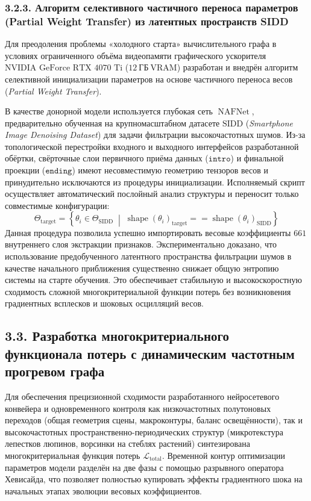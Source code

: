 \documentclass[12pt,a4paper]{article}
\begin{document}
\subsubsection{3.2.3. Алгоритм селективного частичного переноса параметров (Partial Weight Transfer) из латентных пространств SIDD}

Для преодоления проблемы «холодного старта» вычислительного графа в условиях ограниченного объёма видеопамяти графического ускорителя $\text{NVIDIA GeForce RTX 4070 Ti}$ ($12~\text{ГБ}~\text{VRAM}$) разработан и внедрён алгоритм селективной инициализации параметров на основе частичного переноса весов (\textit{Partial Weight Transfer}). 

В качестве донорной модели используется глубокая сеть $\operatorname{NAFNet}$, предварительно обученная на крупномасштабном датасете $\text{SIDD}$ (\textit{Smartphone Image Denoising Dataset}) для задачи фильтрации высокочастотных шумов. Из-за топологической перестройки входного и выходного интерфейсов разработанной обёртки, свёрточные слои первичного приёма данных ($\texttt{intro}$) и финальной проекции ($\texttt{ending}$) имеют несовместимую геометрию тензоров весов и принудительно исключаются из процедуры инициализации. Исполняемый скрипт осуществляет автоматический послойный анализ структуры и переносит только совместимые конфигурации:
\begin{equation}
\Theta_{\text{target}} = \left\{ \theta_i \in \Theta_{\text{SIDD}} \;\middle|\; \operatorname{shape}(\theta_i)_{\text{target}} == \operatorname{shape}(\theta_i)_{\text{SIDD}} \right\}
\end{equation}
Данная процедура позволила успешно импортировать весовые коэффициенты $661$ внутреннего слоя экстракции признаков. Экспериментально доказано, что использование предобученного латентного пространства фильтрации шумов в качестве начального приближения существенно снижает общую энтропию системы на старте обучения. Это обеспечивает стабильную и высокоскоростную сходимость сложной многокритериальной функции потерь без возникновения градиентных всплесков и шоковых осцилляций весов.


\subsection{3.3. Разработка многокритериального функционала потерь с динамическим частотным прогревом графа}

Для обеспечения прецизионной сходимости разработанного нейросетевого конвейера и одновременного контроля как низкочастотных полутоновых переходов (общая геометрия сцены, макроконтуры, баланс освещённости), так и высокочастотных пространственно-периодических структур (микротекстура лепестков люпинов, ворсинки на стеблях растений) синтезирована многокритериальная функция потерь $\mathcal{L}_{\operatorname{total}}$. Временной контур оптимизации параметров модели разделён на две фазы с помощью разрывного оператора Хевисайда, что позволяет полностью купировать эффекты градиентного шока на начальных этапах эволюции весовых коэффициентов.
\end{document}
